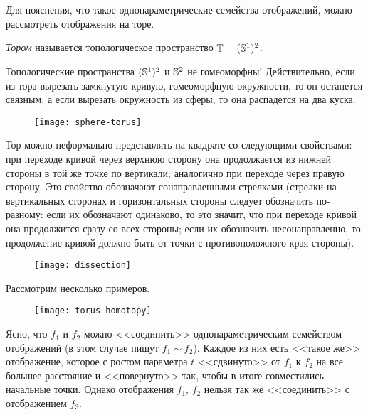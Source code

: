 \documentclass[main]{subfiles}
\begin{document}

\section{}

Для пояснения, что такое однопараметрические семейства отображений, можно рассмотреть отображения на торе.

\begin{definition}
	\emph{Тором} называется топологическое пространство $ \T = (\S^1)^2 $.
\end{definition}

\begin{remark}
	Топологические пространства $ (\S^1)^2 $ и $ \S^2 $ не гомеоморфны! Действительно, если из тора вырезать замкнутую
	кривую, гомеоморфную окружности, то он останется связным, а если вырезать окружность из сферы, то она распадется
	на два куска.
\end{remark}

\begin{figure}[H]
	\centering \texttt{[image: sphere-torus]}
\end{figure}

Тор можно неформально представлять на квадрате со следующими свойствами: при переходе кривой через верхнюю сторону она
продолжается из нижней стороны в той же точке по вертикали; аналогично при переходе через правую сторону. Это свойство
обозначают сонаправленными стрелками (стрелки на вертикальных сторонах и горизонтальных стороны следует обозначить
по-разному: если их обозначают одинаково, то это значит, что при переходе кривой она продолжится сразу со всех стороны;
если их обозначить несонаправленно, то продолжение кривой должно быть от точки с противоположного края стороны).

\begin{figure}[H]
	\centering \texttt{[image: dissection]}
\end{figure}

Рассмотрим несколько примеров.

\begin{figure}[H]
	\centering \texttt{[image: torus-homotopy]}
\end{figure}

Ясно, что $ f_1 $ и $ f_2 $ можно <<соединить>> однопараметрическим семейством отображений (в этом случае пишут
$ f_1 \sim f_2 $). Каждое из них есть <<такое же>> отображение, которое с ростом параметра $ t $ <<сдвинуто>> от
$ f_1 $ к $ f_2 $ на все большее расстояние и <<повернуто>> так, чтобы в итоге совместились начальные точки.
Однако отображения $ f_1 $, $ f_2 $ нельзя так же <<соединить>> с отображением $ f_3 $.
\end{document}

